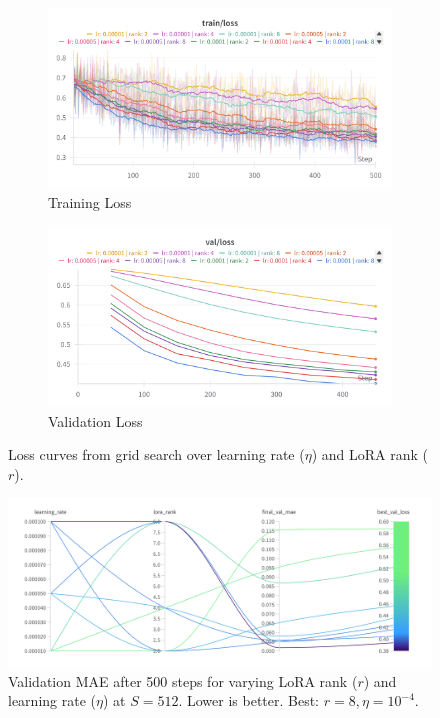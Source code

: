 \documentclass{article}
\begin{document}
\begin{figure}[!htbp]
    \centering
    \begin{subfigure}[b]{0.48\linewidth} \centering
        \includegraphics[width=\linewidth]{M2 Course Work//Images/grid_search_training_loss.png}
        \caption{Training Loss} \label{fig:grid_search_lr_rank_train_loss}
    \end{subfigure} \hfill
    \begin{subfigure}[b]{0.48\linewidth} \centering
        \includegraphics[width=\linewidth]{M2 Course Work//Images/grid_search_validiation_loss.png}
        \caption{Validation Loss} \label{fig:grid_search_lr_rank_valid_loss}
    \end{subfigure}
    \caption{Loss curves from grid search over learning rate ($\eta$) and LoRA rank ($r$).} %
    \label{fig:grid_search_lr_rank_loss_curves}
\end{figure}

\begin{figure}[!htbp]
    \centering
    \includegraphics[width=0.6\linewidth]{M2 Course Work//Images/grid_search_result.png}
    \caption{Validation MAE after 500 steps for varying LoRA rank ($r$) and learning rate ($\eta$) at $S=512$. Lower is better. Best: $r=8, \eta=10^{-4}$.} %
    \label{fig:grid_search_lr_rank_results}
\end{figure}
\end{document}
